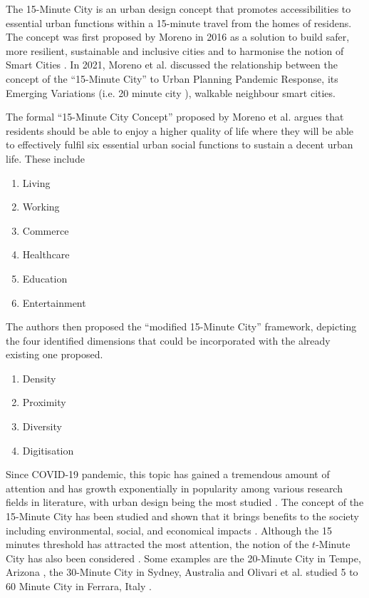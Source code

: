 The 15-Minute City is an urban design concept that promotes accessibilities to essential urban functions within a 15-minute travel from the homes of residens. The concept was first proposed by Moreno in 2016 as a solution to build safer, more resilient, sustainable and inclusive cities and to harmonise the notion of Smart Cities \cite{moreno_introducing_2021}. In 2021, Moreno et al. discussed the relationship between the concept of the “15-Minute City” to Urban Planning Pandemic Response, its Emerging Variations (i.e. 20 minute city \cite{capasso_da_silva_accessibility_2019}), walkable neighbour \cite{weng_15-minute_2019} smart cities.

The formal “15-Minute City Concept” proposed by Moreno et al. argues that residents should be able to enjoy a higher quality of life where they will be able to effectively fulfil six essential urban social functions to sustain a decent urban life. These include

\begin{multicols}{2}
    \begin{enumerate}
        \item Living
        \item Working
        \item Commerce
        \item Healthcare
        \item Education
        \item Entertainment
    \end{enumerate}
\end{multicols}

The authors then proposed the “modified 15-Minute City” framework, depicting the four identified dimensions that could be incorporated with the already existing one proposed.

\begin{multicols}{2}
    \begin{enumerate}
        \item Density
        \item Proximity
        \item Diversity
        \item Digitisation
    \end{enumerate}
\end{multicols}
Since COVID-19 pandemic, this topic has gained a tremendous amount of attention and has growth exponentially in popularity \cite{lima_quest_2023,allam_theoretical_2022} among various research fields in literature, with urban design being the most studied \cite{lima_quest_2023}. The concept of the 15-Minute City has been studied and shown that it brings benefits to the society including environmental, social, and economical impacts \cite{allam_theoretical_2022}. Although the 15 minutes threshold has attracted the most attention, the notion of the $t$-Minute City has also been considered \cite{moreno_introducing_2021}. Some examples are the 20-Minute City in Tempe, Arizona \cite{capasso_da_silva_accessibility_2019}, the 30-Minute City in Sydney, Australia \cite{sarkar_measuring_2020} and Olivari et al. studied 5 to 60 Minute City in Ferrara, Italy \cite{olivari_are_2023}. 

